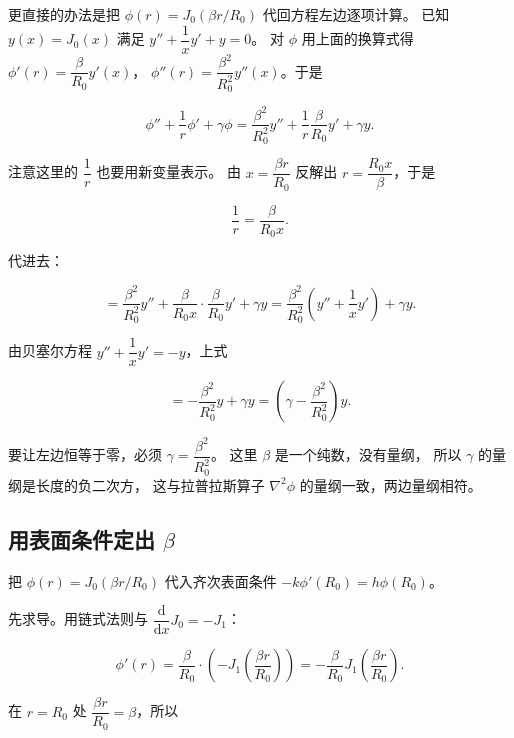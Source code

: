 更直接的办法是把 $\phi(r)=J_0(\beta r/R_0)$ 代回方程左边逐项计算。
已知 $y(x)=J_0(x)$ 满足 $y''+\dfrac{1}{x}y'+y=0$。
对 $\phi$ 用上面的换算式得 $\phi'(r)=\dfrac{\beta}{R_0}y'(x)$，
$\phi''(r)=\dfrac{\beta^2}{R_0^2}y''(x)$。于是

\begin{equation}
\phi''+\frac{1}{r}\phi'+\gamma\phi
=\frac{\beta^2}{R_0^2}y''+\frac{1}{r}\frac{\beta}{R_0}y'+\gamma y .
\end{equation}

注意这里的 $\dfrac{1}{r}$ 也要用新变量表示。
由 $x=\dfrac{\beta r}{R_0}$ 反解出 $r=\dfrac{R_0 x}{\beta}$，于是

\begin{equation}
\frac{1}{r}=\frac{\beta}{R_0 x}.
\end{equation}

代进去：

\begin{equation}
=\frac{\beta^2}{R_0^2}y''+\frac{\beta}{R_0 x}\cdot\frac{\beta}{R_0}y'+\gamma y
=\frac{\beta^2}{R_0^2}\left(y''+\frac{1}{x}y'\right)+\gamma y .
\end{equation}

由贝塞尔方程 $y''+\dfrac{1}{x}y'=-y$，上式

\begin{equation}
=-\frac{\beta^2}{R_0^2}y+\gamma y
=\left(\gamma-\frac{\beta^2}{R_0^2}\right)y .
\end{equation}

要让左边恒等于零，必须 $\gamma=\dfrac{\beta^2}{R_0^2}$。
这里 $\beta$ 是一个纯数，没有量纲，
所以 $\gamma$ 的量纲是长度的负二次方，
这与拉普拉斯算子 $\nabla^2\phi$ 的量纲一致，两边量纲相符。

\subsection{用表面条件定出 $\beta$}

把 $\phi(r)=J_0(\beta r/R_0)$ 代入齐次表面条件
$-k\phi'(R_0)=h\phi(R_0)$。

先求导。用链式法则与 $\dfrac{\mathrm{d}}{\mathrm{d}x}J_0=-J_1$：

\begin{equation}
\phi'(r)=\frac{\beta}{R_0}\cdot\left(-J_1\!\left(\frac{\beta r}{R_0}\right)\right)
=-\frac{\beta}{R_0}J_1\!\left(\frac{\beta r}{R_0}\right).
\end{equation}

在 $r=R_0$ 处 $\dfrac{\beta r}{R_0}=\beta$，所以


